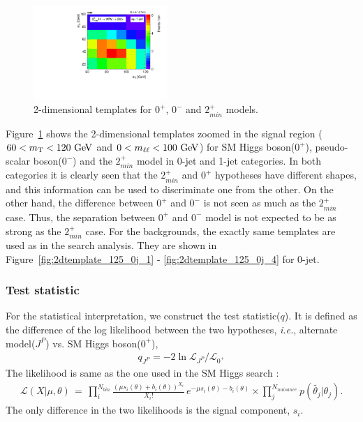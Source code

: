 \begin{figure}[ht!]
\includegraphics[width=0.45\textwidth]{figures/2d_prefit_1j_125_spin2_paper.pdf}
\caption{2-dimensional templates for $0^+$, $0^-$ and $2_{min}^+$ models.} 
\label{fig:2dtemplates_spin} 
\end{figure} 

Figure~\ref{fig:2dtemplates_spin} shows the 2-dimensional templates zoomed in the signal region
($60<m_{\mathrm{T}}<120~\mathrm{Ge\kern -0.1em V}$ and $0<m_{\ell\ell}<100~\mathrm{Ge\kern -0.1em V}$) for SM Higgs boson($0^+$), 
pseudo-scalar boson($0^-$) and the $2_{min}^+$ model in 0-jet and 1-jet categories. 
In both categories it is clearly seen that the $2_{min}^+$ and $0^+$ hypotheses have different shapes,
and this information can be used to discriminate one from the other.
On the other hand, the difference between $0^+$ and $0^-$ 
is not seen as much as the $2_{min}^+$ case. 
Thus, the separation between $0^+$ and $0^-$ model is not expected to be 
as strong as the $2_{min}^+$ case.  
For the backgrounds, the exactly same templates are used as in the 
search analysis. They are shown in Figure~\ref{fig:2dtemplate_125_0j_1}
- \ref{fig:2dtemplate_125_0j_4} for 0-jet. 

\subsubsection{Test statistic}

For the statistical interpretation, we construct the test statistic($q$). 
It is defined as the difference of the log likelihood between the two 
hypotheses, \textit{i.e.}, alternate model($J^P$) vs. SM Higgs boson($0^+$), 
\begin{eqnarray} 
q_{J^P} = -2 \ln \mathcal{L}_{J^P} / \mathcal{L}_{0^+}  
\end{eqnarray} 
The likelihood is same as the one used in the SM Higgs search :  
\begin{eqnarray} 
\mathcal{L} ( X | \mu, \theta) 
\, = \,
\prod_{i}^{N_{bin}} \frac{ \left( \mu s_i(\theta) + b_i(\theta) \right)^{X_i}}{X_i!} 
\, e^{ - \mu s_i(\theta) - b_i(\theta) }   \times
\prod_{j}^{N_{nuisance}} p\left( \tilde{\theta_j} | \theta_j \right).
\end{eqnarray}
The only difference in the two likelihoods is the signal component, $s_i$.

